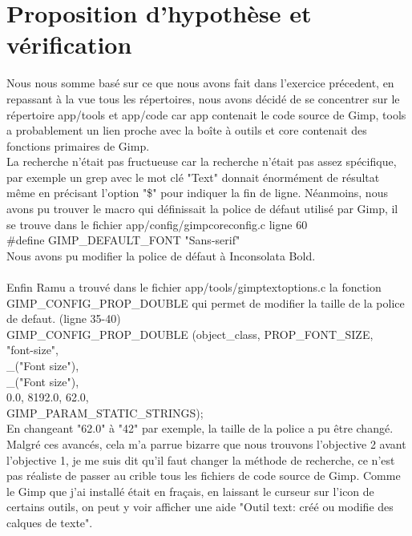 \documentclass[12pt, letterpaper]{article}
\begin{document}
\section{Proposition d'hypothèse et vérification}
Nous nous somme basé sur ce que nous avons fait dans l'exercice précedent, en repassant à la vue tous les répertoires, nous avons décidé de se concentrer sur le répertoire app/tools et app/code car app contenait le code source de Gimp, tools a probablement un lien proche avec la boîte à outils et core contenait des fonctions primaires de Gimp.\\
La recherche n'était pas fructueuse car la recherche n'était pas assez spécifique, par exemple un grep avec le mot clé "Text" donnait énormément de résultat même en précisant l'option "\$" pour indiquer la fin de ligne.
Néanmoins, nous avons pu trouver le macro qui définissait la police de défaut utilisé par Gimp, il se trouve dans le fichier app/config/gimpcoreconfig.c ligne 60\\
\#define GIMP\_DEFAULT\_FONT          "Sans-serif"\\
Nous avons pu modifier la police de défaut à Inconsolata Bold.\\ \\
Enfin Ramu a trouvé dans le fichier app/tools/gimptextoptions.c la fonction GIMP\_CONFIG\_PROP\_DOUBLE qui permet de modifier la taille de la police de defaut. (ligne 35-40)\\
GIMP\_CONFIG\_PROP\_DOUBLE (object\_class, PROP\_FONT\_SIZE,\\
                     "font-size",\\
                     \_("Font size"),\\
                     \_("Font size"),\\
                     0.0, 8192.0, 62.0,\\
                     GIMP\_PARAM\_STATIC\_STRINGS);\\
En changeant "62.0" à "42" par exemple, la taille de la police a pu être changé.\\
Malgré ces avancés, cela m'a parrue bizarre que nous trouvons l'objective 2 avant l'objective 1, je me suis dit qu'il faut changer la méthode de recherche, ce n'est pas réaliste de passer au crible tous les fichiers de code source de Gimp. Comme le Gimp que j'ai installé était en fraçais, en laissant le curseur sur l'icon de certains outils, on peut y voir afficher une aide "Outil text: créé ou modifie des calques de texte". \\
\end{document}
